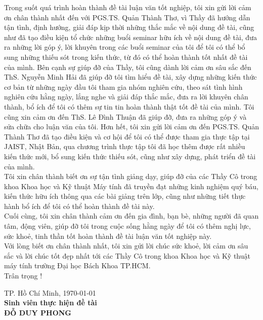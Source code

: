 \setlength\parindent{0pt}
\hspace{0.5cm}Trong suốt quá trình hoàn thành đề tài luận văn tốt nghiệp, tôi xin gửi lời cảm ơn chân thành nhất đến với PGS.TS. Quản Thành Thơ, vì Thầy đã hướng dẫn tận tình, định hướng, giải đáp kịp thời những thắc mắc về nội dung đề tài, cũng như đã tạo điều kiện tổ chức những buổi seminar hữu ích về nội dung đề tài, đưa ra những lời góp ý, lời khuyên trong các buổi seminar của tôi để tôi có thể bổ sung những thiếu sót trong kiến thức, từ đó có thể hoàn thành tốt nhất đề tài của mình. Bên cạnh sự giúp đỡ của Thầy, tôi cũng dành lời cảm ơn sâu sắc đến ThS. Nguyễn Minh Hải đã giúp đỡ tôi tìm hiểu đề tài, xây dựng những kiến thức cơ bản từ những ngày đầu tôi tham gia nhóm nghiên cứu, theo sát tình hình nghiên cứu hằng ngày, lắng nghe và giải đáp thắc mắc, đưa ra lời khuyên chân thành, bổ ích để tôi có thêm sự tin tin hoàn thành thật tốt đề tài của mình. Tôi cũng xin cảm ơn đến ThS. Lê Đình Thuận đã giúp đỡ, đưa ra những góp ý và sửa chữa cho luận văn của tôi. Hơn hết, tôi xin gửi lời cảm ơn đến PGS.TS. Quản Thành Thơ đã tạo điều kiện và cơ hội để tôi có thể được tham gia thực tập tại JAIST, Nhật Bản, qua chương trình thực tập tôi đã học thêm được rất nhiều kiến thức mới, bổ sung kiến thức thiếu sót, cũng như xây dựng, phát triển đề tài của mình.\\

\hspace{0.5cm}Tôi xin chân thành biết ơn sự tận tình giảng dạy, giúp đỡ của các Thầy Cô trong khoa Khoa học và Kỹ thuật Máy tính đã truyền đạt những kinh nghiệm quý báu, kiến thức hữu ích thông qua các bài giảng trên lớp, cũng như những tiết thực hành bổ ích để tôi có thể hoàn thành đề tài này.\\

\hspace{0.5cm}Cuối cùng, tôi xin chân thành cảm ơn đến gia đình, bạn bè, những người đã quan tâm, động viên, giúp đỡ tôi trong cuộc sống hằng ngày để tôi có thêm nghị lực, sức khoẻ, tinh thần tốt hoàn thành đề tài luận văn tốt nghiệp này.\\

\hspace{0.5cm}Với lòng biết ơn chân thành nhất, tôi xin gửi lời chúc sức khoẻ, lời cảm ơn sâu sắc và lời chúc tốt đẹp nhất tới các Thầy Cô trong khoa Khoa học và Kỹ thuật máy tính trường Đại học Bách Khoa TP.HCM.\\

\hspace{0.5cm}Trân trọng !\\

\hspace{5cm}
\begin{minipage}[t]{0.60\linewidth}
	\begin{center}
		TP. Hồ Chí Minh, \today\\
		\textbf{Sinh viên thực hiện đề tài}\\[3cm]
		\textbf{ĐỖ DUY PHONG}
	\end{center}
\end{minipage}
